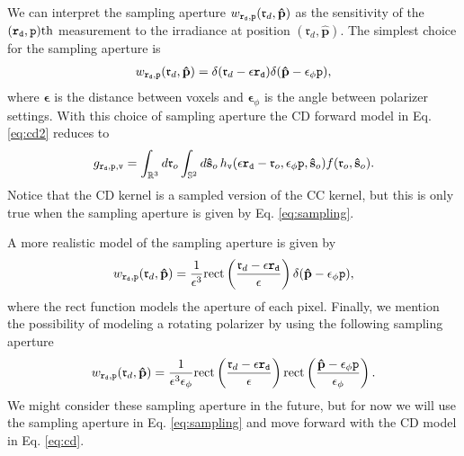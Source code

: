 \documentclass[11pt]{article}
\providecommand{\mb}[1]{\mathbf{#1}}
\providecommand{\ro}{\mathbf{\mathfrak{r}}_o}
\providecommand{\so}{\mathbf{\hat{s}}_o}
\providecommand{\rd}{\mathbf{\mathfrak{r}}_d}
\providecommand{\mh}[1]{\mathbf{\hat{#1}}}
\providecommand{\mbb}[1]{\mathbb{#1}}
\providecommand{\tv}{\texttt{v}}
\providecommand{\tb}[1]{\textbf{#1}}
\providecommand{\ttt}[1]{\texttt{#1}}
\providecommand{\p}{\mh{p}}
\providecommand{\intr}[1]{\int_{\mbb{R}^{#1}}}
\providecommand{\ints}[1]{\int_{\mbb{S}^{#1}}}
\begin{document}
We can interpret the sampling aperture
$w_{\tb{\ttt{r}}_{\ttt{d}}, \ttt{p}}(\rd, \p)$ as the sensitivity of the
$(\tb{\ttt{r}}_{\ttt{d}}, \ttt{p})\text{th}$ measurement to the irradiance at
position $(\rd, \p)$. The simplest choice for the sampling aperture is 
\begin{align}
  w_{\tb{\ttt{r}}_{\ttt{d}}, \ttt{p}}(\rd, \p) = \delta(\rd - \mb{\epsilon}\tb{\ttt{r}}_{\ttt{d}})\delta(\mh{p} - \mb{\epsilon}_{\phi}\ttt{p}), \label{eq:sampling}
\end{align}
where $\mb{\epsilon}$ is the distance between voxels and $\mb{\epsilon}_{\phi}$
is the angle between polarizer settings. With this choice of sampling aperture the
CD forward model in Eq. \ref{eq:cd2} reduces to 
\begin{align}
  g_{\tb{\ttt{r}}_{\ttt{d}},\ttt{p},\ttt{v}} = \intr{3}d\ro \ints{2}d\so\, h_{\tv}(\mb{\epsilon}\tb{\ttt{r}}_{\ttt{d}} - \ro, \mb{\epsilon}_{\phi}\ttt{p}, \so)f(\ro, \so). 
\end{align}
Notice that the CD kernel is a sampled version of the CC kernel, but this is
only true when the sampling aperture is given by Eq. \ref{eq:sampling}.

A more realistic model of the sampling aperture is given by
\begin{align}
  w_{\tb{\ttt{r}}_{\ttt{d}}, \ttt{p}}(\rd, \p) = \frac{1}{\epsilon^3}\text{rect}\left(\frac{\rd - \mb{\epsilon}\tb{\ttt{r}}_{\ttt{d}}}{\mb{\epsilon}}\right)\delta(\mh{p} - \mb{\epsilon}_{\phi}\ttt{p}),
\end{align}
where the rect function models the aperture of each pixel. Finally, we mention
the possibility of modeling a rotating polarizer by using the following sampling
aperture
\begin{align}
  w_{\tb{\ttt{r}}_{\ttt{d}}, \ttt{p}}(\rd, \p) = \frac{1}{\epsilon^3\epsilon_{\phi}}\text{rect}\left(\frac{\rd - \mb{\epsilon}\tb{\ttt{r}}_{\ttt{d}}}{\mb{\epsilon}}\right)\text{rect}\left(\frac{\mh{p} - \mb{\epsilon}_{\phi}\ttt{p}}{\mb{\epsilon}_\phi}\right).
\end{align}
We might consider these sampling aperture in the future, but for now we will use
the sampling aperture in Eq. \ref{eq:sampling} and move forward with the CD model in Eq. \ref{eq:cd}. 
\end{document}
